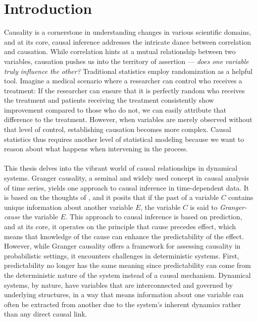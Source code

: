 \documentclass[11pt, a4paper]{memoir}
\theoremstyle{break}
\theoremstyle{break}
\theoremstyle{nonumberplain}
\begin{document}
\normalem

\newpage
\mainmatter

\chapter{Introduction}
Causality is a cornerstone in understanding changes in various scientific domains, and at its core, causal inference addresses the intricate dance between correlation and causation. While correlation hints at a mutual relationship between two variables, causation pushes us into the territory of assertion — \textit{does one variable truly influence the other?} Traditional statistics employ randomization as a helpful tool. Imagine a medical scenario where a researcher can control who receives a treatment: If the researcher can ensure that it is perfectly random who receives the treatment and patients receiving the treatment consistently show improvement compared to those who do not, we can easily attribute that difference to the treatment. However, when variables are merely observed without that level of control, establishing causation becomes more complex. Causal statistics thus requires another level of statistical modeling because we want to reason about what happens when intervening in the process.\\\\
This thesis delves into the vibrant world of causal relationships in dynamical systems. Granger causality, a seminal and widely used concept in causal analysis of time series, yields one approach to causal inference in time-dependent data. It is based on the thoughts of \cite{Granger}, and it posits that if the past of a variable $C$ contains unique information about another variable $E$, the variable $C$ is said to \emph{Granger-cause} the variable $E$. This approach to causal inference is based on prediction, and at its core, it operates on the principle that cause precedes effect, which means that knowledge of the cause can enhance the predictability of the effect. However, while Granger causality offers a framework for assessing causality in probabilistic settings, it encounters challenges in deterministic systems. First, predictability no longer has the same meaning since predictability can come from the deterministic nature of the system instead of a causal mechanism. Dynamical systems, by nature, have variables that are interconnected and governed by underlying structures, in a way that means information about one variable can often be extracted from another due to the system's inherent dynamics rather than any direct causal link.\\\\
\end{document}
